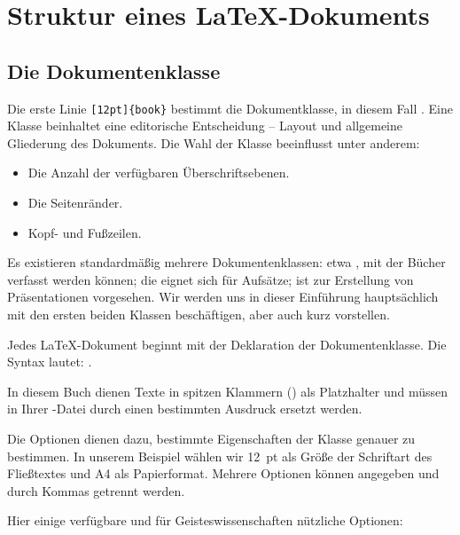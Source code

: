 \section{Struktur eines \LaTeX-Dokuments}

\subsection{Die Dokumentenklasse}
Die erste Linie \verb|[12pt]{book}| bestimmt die Dokumentklasse, in diesem Fall . Eine Klasse beinhaltet eine editorische Entscheidung -- Layout und allgemeine Gliederung des Dokuments. Die Wahl der Klasse beeinflusst unter anderem:

\begin{itemize}
\item Die Anzahl der verfügbaren Überschriftsebenen.
\item Die Seitenränder.
\item Kopf- und Fußzeilen.
\end{itemize}

Es existieren standardmäßig mehrere Dokumentenklassen: etwa , mit der Bücher verfasst werden können; die  eignet sich für Aufsätze;  ist zur Erstellung von Präsentationen vorgesehen. Wir werden uns in dieser Einführung hauptsächlich mit den ersten beiden Klassen beschäftigen,  aber auch kurz vorstellen.


Jedes \LaTeX-Dokument beginnt mit der Deklaration der Dokumentenklasse. Die Syntax lautet: .

\begin{attention}
In diesem Buch dienen Texte in spitzen Klammern () als Platzhalter und müssen in Ihrer -Datei durch einen bestimmten Ausdruck ersetzt werden.
\end{attention}

Die Optionen dienen dazu, bestimmte Eigenschaften der Klasse genauer zu bestimmen. In unserem Beispiel wählen wir 12~pt als Größe der Schriftart des Fließtextes und A4 als Papierformat. Mehrere Optionen können angegeben und durch Kommas getrennt werden.\label{optionsclasse}

Hier einige verfügbare und für Geisteswissenschaften nützliche Optionen:

